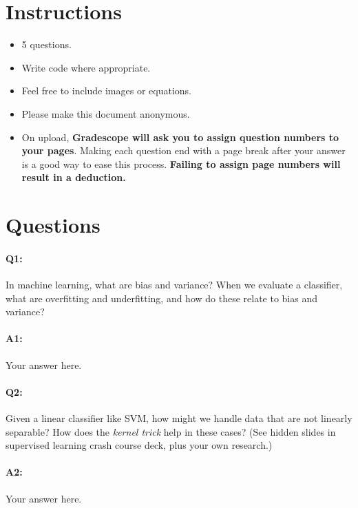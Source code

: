 \section*{Instructions}
\begin{itemize}
  \item 5 questions.
  \item Write code where appropriate.
  \item Feel free to include images or equations.
  \item Please make this document anonymous.
  \item On upload, \textbf{Gradescope will ask you to assign question numbers to your pages}. Making each question end with a page break after your answer is a good way to ease this process. \textbf{Failing to assign page numbers will result in a deduction.}
\end{itemize}

\section*{Questions}


\paragraph{Q1:} In machine learning, what are bias and variance? When we evaluate a classifier, what are overfitting and underfitting, and how do these relate to bias and variance?

\paragraph{A1:} Your answer here.




\pagebreak
\paragraph{Q2:} Given a linear classifier like SVM, how might we handle data that are not linearly separable? How does the \emph{kernel trick} help in these cases? (See hidden slides in supervised learning crash course deck, plus your own research.)

\paragraph{A2:} Your answer here.



